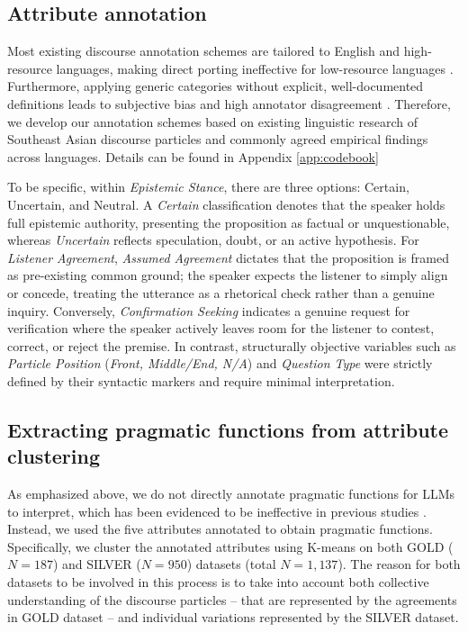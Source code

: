 \documentclass[11pt]{article}
\begin{document}
\subsection{Attribute annotation}
Most existing discourse annotation schemes are tailored to English and high-resource languages, making direct porting ineffective for low-resource languages \citep{vargas2025discourse}. Furthermore, applying generic categories without explicit, well-documented definitions leads to subjective bias and high annotator disagreement \citep{crible2015unified}. Therefore, we develop our annotation schemes based on existing linguistic research of Southeast Asian discourse particles and commonly agreed empirical findings across languages. Details can be found in Appendix \ref{app:codebook}



To be specific, within \textit{Epistemic Stance}, there are three options: Certain, Uncertain, and Neutral. A \textit{Certain} classification denotes that the speaker holds full epistemic authority, presenting the proposition as factual or unquestionable, whereas \textit{Uncertain} reflects speculation, doubt, or an active hypothesis. For \textit{Listener Agreement}, \textit{Assumed Agreement} dictates that the proposition is framed as pre-existing common ground; the speaker expects the listener to simply align or concede, treating the utterance as a rhetorical check rather than a genuine inquiry. Conversely, \textit{Confirmation Seeking} indicates a genuine request for verification where the speaker actively leaves room for the listener to contest, correct, or reject the premise. In contrast, structurally objective variables such as \textit{Particle Position} (\textit{Front, Middle/End, N/A}) and \textit{Question Type} were strictly defined by their syntactic markers and require minimal interpretation.


\subsection{Extracting pragmatic functions from attribute clustering}
As emphasized above, we do not directly annotate pragmatic functions for LLMs to interpret, which has been evidenced to be ineffective in previous studies \citep{defelice2013classification}. Instead, we used the five attributes annotated to obtain pragmatic functions. Specifically, we cluster the annotated attributes using K-means on both GOLD ($N=187$) and SILVER ($N=950$) datasets (total $N=1{,}137$). The reason for both datasets to be involved in this process is to take into account both collective understanding of the discourse particles -- that are represented by the agreements in GOLD dataset -- and individual variations represented by the SILVER dataset. 
\end{document}
